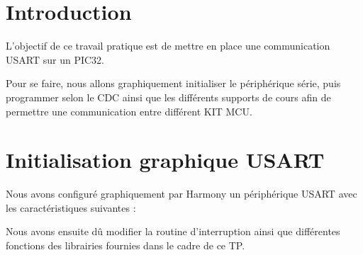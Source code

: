 \section{Introduction}
L'objectif de ce travail pratique est de mettre en place une communication USART sur un PIC32.

Pour se faire, nous allons graphiquement initialiser le périphérique série, puis programmer selon le CDC ainsi que les différents supports de cours afin de permettre une communication entre différent KIT MCU.


\section{Initialisation graphique USART}
{
    Nous avons configuré graphiquement par Harmony un périphérique USART avec les caractéristiques suivantes :
    
       \vspace{+4mm}
    
    Nous avons ensuite dû modifier la routine d'interruption ainsi que différentes fonctions des librairies fournies dans le cadre de ce TP.    
}

\clearpage
